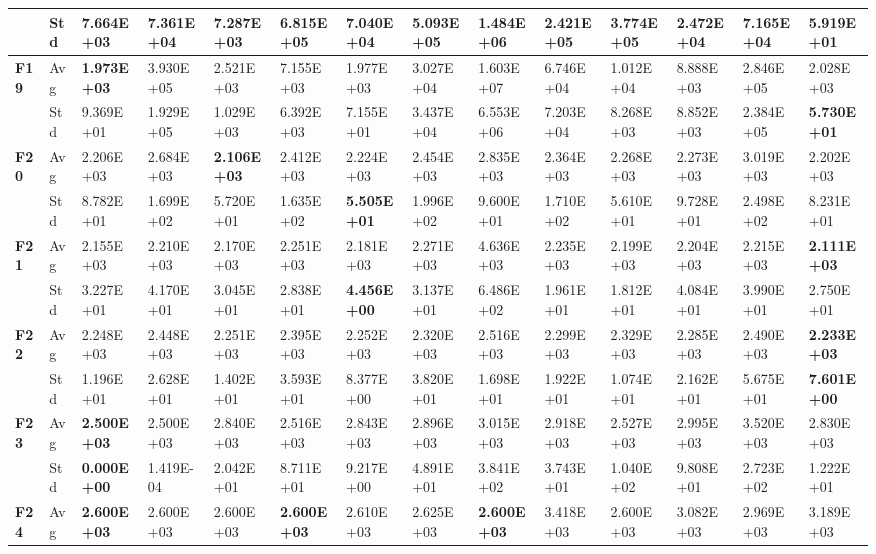 \documentclass{article} %
\begin{document}
\begin{tabular}{|p{0.2in}|p{0.2in}|p{0.4in}|p{0.4in}|p{0.4in}|p{0.4in}|p{0.4in}|p{0.4in}|p{0.4in}|p{0.4in}|p{0.4in}|p{0.4in}|p{0.4in}|p{0.4in}|}
\textbf{} & Std & 7.664E+03 & 7.361E+04 & 7.287E+03 & 6.815E+05 & 7.040E+04 & 5.093E+05 & 1.484E+06 & 2.421E+05 & 3.774E+05 & 2.472E+04 & 7.165E+04 & \textbf{5.919E+01} \\ \hline 
\textbf{F19} & Avg & \textbf{1.973E+03} & 3.930E+05 & 2.521E+03 & 7.155E+03 & 1.977E+03 & 3.027E+04 & 1.603E+07 & 6.746E+04 & 1.012E+04 & 8.888E+03 & 2.846E+05 & 2.028E+03 \\ \hline 
\textbf{} & Std & 9.369E+01 & 1.929E+05 & 1.029E+03 & 6.392E+03 & 7.155E+01 & 3.437E+04 & 6.553E+06 & 7.203E+04 & 8.268E+03 & 8.852E+03 & 2.384E+05 & \textbf{5.730E+01} \\ \hline 
\textbf{F20} & Avg & 2.206E+03 & 2.684E+03 & \textbf{2.106E+03} & 2.412E+03 & 2.224E+03 & 2.454E+03 & 2.835E+03 & 2.364E+03 & 2.268E+03 & 2.273E+03 & 3.019E+03 & 2.202E+03 \\ \hline 
 & Std & 8.782E+01 & 1.699E+02 & 5.720E+01 & 1.635E+02 & \textbf{5.505E+01} & 1.996E+02 & 9.600E+01 & 1.710E+02 & 5.610E+01 & 9.728E+01 & 2.498E+02 & 8.231E+01 \\ \hline 
\textbf{F21} & Avg\textbf{} & 2.155E+03 & 2.210E+03 & 2.170E+03 & 2.251E+03 & 2.181E+03 & 2.271E+03 & 4.636E+03 & 2.235E+03 & 2.199E+03 & 2.204E+03 & 2.215E+03 & \textbf{2.111E+03} \\ \hline 
\textbf{} & Std\textbf{} & 3.227E+01 & 4.170E+01 & 3.045E+01 & 2.838E+01 & \textbf{4.456E+00} & 3.137E+01 & 6.486E+02 & 1.961E+01 & 1.812E+01 & 4.084E+01 & 3.990E+01 & 2.750E+01 \\ \hline 
\textbf{F22} & Avg & 2.248E+03 & 2.448E+03 & 2.251E+03 & 2.395E+03 & 2.252E+03 & 2.320E+03 & 2.516E+03 & 2.299E+03 & 2.329E+03 & 2.285E+03 & 2.490E+03 & \textbf{2.233E+03} \\ \hline 
\textbf{} & Std & 1.196E+01 & 2.628E+01 & 1.402E+01 & 3.593E+01 & 8.377E+00 & 3.820E+01 & 1.698E+01 & 1.922E+01 & 1.074E+01 & 2.162E+01 & 5.675E+01 & \textbf{7.601E+00} \\ \hline 
\textbf{F23} & Avg & \textbf{2.500E+03} & 2.500E+03 & 2.840E+03 & 2.516E+03 & 2.843E+03 & 2.896E+03 & 3.015E+03 & 2.918E+03 & 2.527E+03 & 2.995E+03 & 3.520E+03 & 2.830E+03 \\ \hline 
\textbf{} & Std & \textbf{0.000E+00} & 1.419E-04 & 2.042E+01 & 8.711E+01 & 9.217E+00 & 4.891E+01 & 3.841E+02 & 3.743E+01 & 1.040E+02 & 9.808E+01 & 2.723E+02 & 1.222E+01 \\ \hline 
\textbf{F24} & Avg & \textbf{2.600E+03} & 2.600E+03 & 2.600E+03 & \textbf{2.600E+03} & 2.610E+03 & 2.625E+03 & \textbf{2.600E+03} & 3.418E+03 & 2.600E+03 & 3.082E+03 & 2.969E+03 & 3.189E+03 \\ \hline 

\end{tabular}
\end{document}
